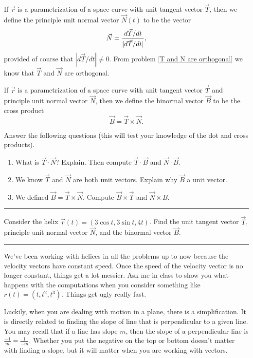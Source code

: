 \begin{definition}
 If $\vec r$ is a parametrization of a space curve with unit tangent vector $\vec T$, then we define the principle unit normal vector $\vec N(t)$ to be the vector
 $$\vec N = \displaystyle\frac{d\vec T/dt}{|d\vec T/dt|},$$
 provided of course that $|d\vec T/dt|\neq 0$. 
 From problem \ref{T and N are orthogonal} we know that $\vec T$ and $\vec N$ are orthogonal.
\end{definition}

\begin{definition}
 If $\vec r$ is a parametrization of a space curve with unit tangent vector $\vec T$ and principle unit normal vector $\vec N$, then we define the binormal vector $\vec B$ to be the cross product
$$\vec B = \vec T\times \vec N.$$
\end{definition}

\begin{problem}
Answer the following questions (this will test your knowledge of the dot and cross products).
\begin{enumerate}
 \item What is $\vec T\cdot \vec N$? Explain. Then compute $\vec T\cdot \vec B$ and $\vec N\cdot \vec B$.
 \item We know $\vec T$ and $\vec N$ are both unit vectors. Explain why $\vec B$ a unit vector. 
 \item We defined $\vec B=\vec T\times \vec N$. Compute $\vec B\times \vec T$ and $\vec N\times B$.
\end{enumerate}
\hrule\end{problem}

\begin{problem} \label{helix example of T N and B}
Consider the helix $\vec r(t) = (3\cos t,3\sin t, 4t)$.  Find the unit tangent vector $\vec T$, principle unit normal vector $\vec N$, and the binormal vector $\vec B$.  
\hrule\end{problem}

We've been working with helices in all the problems up to now because the velocity vectors have constant speed.  Once the speed of the velocity vector is no longer constant, things get a lot messier. Ask me in class to show you what happens with the computations when you consider something like $r(t)=(t,t^2,t^3)$. Things get ugly really fast. 

Luckily, when you are dealing with motion in a plane, there is a simplification.  It is directly related to finding the slope of line that is perpendicular to a given line.  You may recall that if a line has slope $m$, then the slope of a perpendicular line is $\frac{-1}{m}=\frac{1}{-m}$.  Whether you put the negative on the top or bottom doesn't matter with finding a slope, but it will matter when you are working with vectors.  

